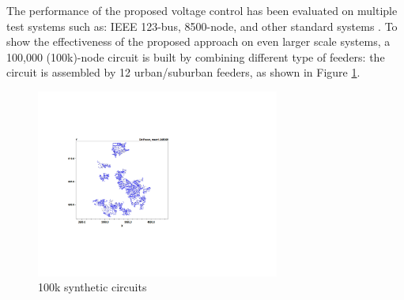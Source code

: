 \documentclass{article}
\begin{document}
The performance of the proposed voltage control has been evaluated on multiple test systems such as: IEEE 123-bus, 8500-node, and other standard systems \cite{rathbun2018impact}. To show the effectiveness of the proposed approach on even larger scale systems, a 100,000 (100k)-node circuit is built by combining different type of feeders: the circuit is assembled by 12 urban/suburban feeders, as shown in Figure \ref{fig:C1ckts}. 
\begin{figure}[ht]
\centering

         \includegraphics[width=8cm]{pics/C1.pdf}

    \caption{100k synthetic circuits}
    \label{fig:C1ckts}
\end{figure}
\end{document}
